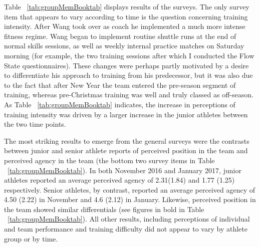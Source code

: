 \begin{CJK}{UTF8}{gbsn}

  


Table ~\ref{tab:groupMemBooktab} displays results of the surveys.  The only survey item that appears to vary according to time is the question concerning training intensity.  After Wang took over as coach he implemented a much more intense fitness regime.  Wang began to implement routine shuttle runs at the end of normal skills sessions, as well as weekly internal practice matches on Saturday morning (for example, the two training sessions after which I conducted the Flow State questionnaires).  These changes were perhaps partly motivated by a desire to differentiate his approach to training from his predecessor, but it was also due to the fact that after New Year the team entered the pre-season segment of training, whereas pre-Christmas training was well and truly classed as off-season. As Table ~\ref{tab:groupMemBooktab} indicates, the increase in perceptions of training intensity was driven by a larger increase in the junior athletes between the two time points.

The most striking results to emerge from the general surveys were the contrasts between junior and senior athlete reports of perceived position in the team and perceived agency in the team (the bottom two survey items in Table ~\ref{tab:groupMemBooktab}).  In both November 2016 and January 2017, junior athletes reported an average perceived agency of 2.31(1.84) and 1.77 (1.25) respectively. Senior athletes, by contrast, reported an average perceived agency of 4.50 (2.22) in November and 4.6 (2.12) in January.  Likewise, perceived position in the team showed similar differentials (see figures in bold in Table ~\ref{tab:groupMemBooktab}).  All other results, including perceptions of individual and team performance and training difficulty did not appear to vary by athlete group or by time.



\end{CJK}

